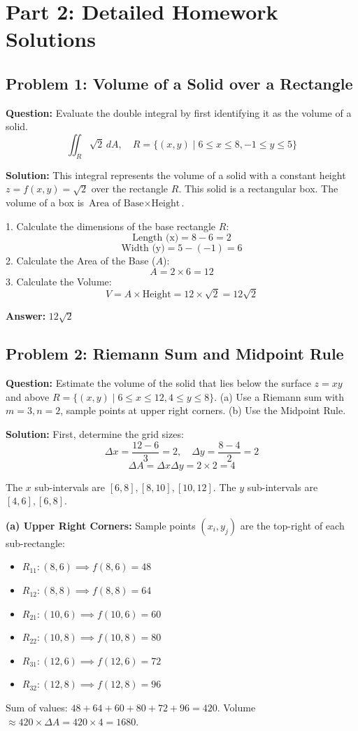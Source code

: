\documentclass[11pt,a4paper]{article}
\begin{document}
\newpage
\section{Part 2: Detailed Homework Solutions}

\subsection*{Problem 1: Volume of a Solid over a Rectangle}
\textbf{Question:} Evaluate the double integral by first identifying it as the volume of a solid.
\[ \iint_R \sqrt{2} \, dA, \quad R = \{(x, y) \mid 6 \le x \le 8, -1 \le y \le 5\} \]

\textbf{Solution:}
This integral represents the volume of a solid with a constant height $z = f(x,y) = \sqrt{2}$ over the rectangle $R$. This solid is a rectangular box.
The volume of a box is $\text{Area of Base} \times \text{Height}$.

1. Calculate the dimensions of the base rectangle $R$:
   \[ \text{Length (x)} = 8 - 6 = 2 \]
   \[ \text{Width (y)} = 5 - (-1) = 6 \]
2. Calculate the Area of the Base ($A$):
   \[ A = 2 \times 6 = 12 \]
3. Calculate the Volume:
   \[ V = A \times \text{Height} = 12 \times \sqrt{2} = 12\sqrt{2} \]

\textbf{Answer:} $12\sqrt{2}$

\subsection*{Problem 2: Riemann Sum and Midpoint Rule}
\textbf{Question:} Estimate the volume of the solid that lies below the surface $z = xy$ and above $R = \{(x, y) \mid 6 \le x \le 12, 4 \le y \le 8\}$.
(a) Use a Riemann sum with $m=3, n=2$, sample points at upper right corners.
(b) Use the Midpoint Rule.

\textbf{Solution:}
First, determine the grid sizes:
\[ \Delta x = \frac{12-6}{3} = 2, \quad \Delta y = \frac{8-4}{2} = 2 \]
\[ \Delta A = \Delta x \Delta y = 2 \times 2 = 4 \]

The $x$ sub-intervals are $[6,8], [8,10], [10,12]$.
The $y$ sub-intervals are $[4,6], [6,8]$.

\textbf{(a) Upper Right Corners:}
Sample points $(x_i, y_j)$ are the top-right of each sub-rectangle:
\begin{itemize}
    \item $R_{11}: (8,6) \implies f(8,6) = 48$
    \item $R_{12}: (8,8) \implies f(8,8) = 64$
    \item $R_{21}: (10,6) \implies f(10,6) = 60$
    \item $R_{22}: (10,8) \implies f(10,8) = 80$
    \item $R_{31}: (12,6) \implies f(12,6) = 72$
    \item $R_{32}: (12,8) \implies f(12,8) = 96$
\end{itemize}
Sum of values: $48 + 64 + 60 + 80 + 72 + 96 = 420$.
Volume $\approx 420 \times \Delta A = 420 \times 4 = 1680$.
\end{document}
